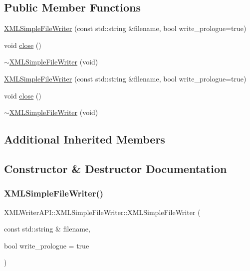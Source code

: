\subsection*{Public Member Functions}
\begin{DoxyCompactItemize}
\item 
\mbox{\hyperlink{classXMLWriterAPI_1_1XMLSimpleFileWriter_a8ce4f6691f7e2e803a14e0cba906a4b7}{X\+M\+L\+Simple\+File\+Writer}} (const std\+::string \&filename, bool write\+\_\+prologue=true)
\item 
void \mbox{\hyperlink{classXMLWriterAPI_1_1XMLSimpleFileWriter_a1ecf825fdd568364791b6d6a4de5ca74}{close}} ()
\item 
\mbox{\hyperlink{classXMLWriterAPI_1_1XMLSimpleFileWriter_a8a18cf3ea74f63a4f84a434237109e68}{$\sim$\+X\+M\+L\+Simple\+File\+Writer}} (void)
\item 
\mbox{\hyperlink{classXMLWriterAPI_1_1XMLSimpleFileWriter_a8ce4f6691f7e2e803a14e0cba906a4b7}{X\+M\+L\+Simple\+File\+Writer}} (const std\+::string \&filename, bool write\+\_\+prologue=true)
\item 
void \mbox{\hyperlink{classXMLWriterAPI_1_1XMLSimpleFileWriter_a1ecf825fdd568364791b6d6a4de5ca74}{close}} ()
\item 
\mbox{\hyperlink{classXMLWriterAPI_1_1XMLSimpleFileWriter_a8a18cf3ea74f63a4f84a434237109e68}{$\sim$\+X\+M\+L\+Simple\+File\+Writer}} (void)
\end{DoxyCompactItemize}
\subsection*{Additional Inherited Members}


\subsection{Constructor \& Destructor Documentation}
\mbox{\label{classXMLWriterAPI_1_1XMLSimpleFileWriter_a8ce4f6691f7e2e803a14e0cba906a4b7}} 
\subsubsection{\texorpdfstring{XMLSimpleFileWriter()}{XMLSimpleFileWriter()}\hspace{0.1cm}{\footnotesize\ttfamily [1/2]}}
{\footnotesize\ttfamily X\+M\+L\+Writer\+A\+P\+I\+::\+X\+M\+L\+Simple\+File\+Writer\+::\+X\+M\+L\+Simple\+File\+Writer (\begin{DoxyParamCaption}\item[{const std\+::string \&}]{filename,  }\item[{bool}]{write\+\_\+prologue = {\ttfamily true} }\end{DoxyParamCaption})\hspace{0.3cm}{\ttfamily [inline]}}

